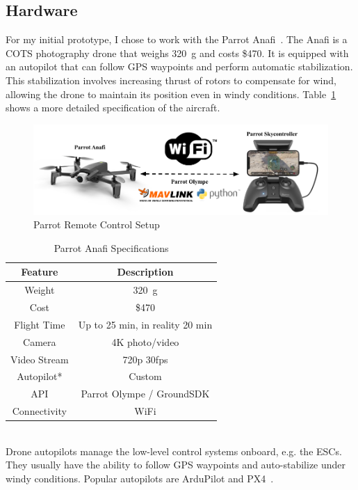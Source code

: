 \subsection{Hardware}
For my initial prototype, I chose to work with the Parrot Anafi~\cite{ParrotAnafi}. The Anafi is a COTS photography drone that weighs 320~g and costs \$470. It is equipped with an autopilot that can follow GPS waypoints and perform automatic stabilization. This stabilization involves increasing thrust of rotors to compensate for wind, allowing the drone to maintain its position even in windy conditions. Table~\ref{tab:anafi-features} shows a more detailed specification of the aircraft.

\begin{figure}
    \centering
    \includegraphics[width=1.0\linewidth]{chapter3/FIGS/ctrl.png}
    \caption{Parrot Remote Control Setup~\cite{ParrotAnafi}}
    \label{fig:parrot-control-setup}
\end{figure}

\begin{table}[]
    \centering
    \begin{tabular}{|c|c|}
     \hline
     \textbf{Feature} & \textbf{Description}  \\
     \hline
     Weight & 320~g \\
     \hline
     Cost & \$470 \\
     \hline
     Flight Time & Up to 25 min, in reality 20 min \\
     \hline
     Camera & 4K photo/video \\
     \hline
     Video Stream & 720p 30fps \\
     \hline
     Autopilot* & Custom \\
     \hline
     API & Parrot Olympe / GroundSDK \\
     \hline
     Connectivity & WiFi \\
     \hline
    \end{tabular}
    \begin{captext}
    \\[0.1cm] \small * Drone autopilots manage the low-level control systems onboard, e.g. the ESCs. They usually have the ability to follow GPS waypoints and auto-stabilize under windy conditions. Popular autopilots are ArduPilot and PX4~\cite{Ardupilot,PX4}.
    \end{captext}
    \caption{Parrot Anafi Specifications}
    \label{tab:anafi-features}
\end{table}

